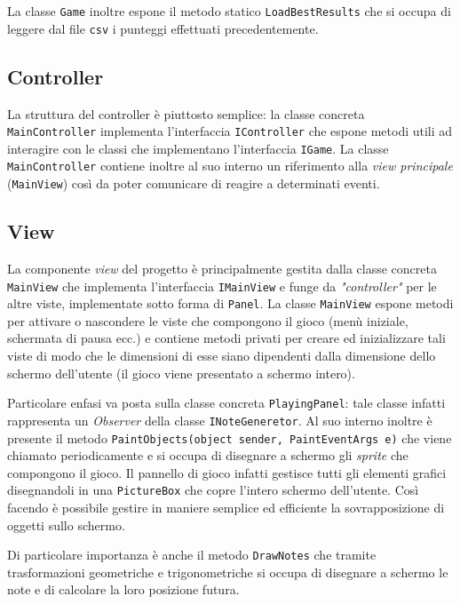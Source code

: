 La classe \texttt{Game} inoltre espone il metodo statico \texttt{LoadBestResults} che si occupa di leggere dal file \texttt{csv} i punteggi effettuati precedentemente.

\newpage
\subsection{Controller}
\begin{figure}[h]
\end{figure}
La struttura del controller è piuttosto semplice: la classe concreta \texttt{MainController} implementa l'interfaccia \texttt{IController} che espone metodi utili ad interagire con le classi che implementano l'interfaccia \texttt{IGame}.
La classe \texttt{MainController} contiene inoltre al suo interno un riferimento alla \emph{view principale} (\texttt{MainView}) così da poter comunicare di reagire a determinati eventi.

\newpage
\subsection{View}
\begin{figure}[h!]
\end{figure}
La componente \emph{view} del progetto è principalmente gestita dalla classe concreta \texttt{MainView} che implementa l'interfaccia \texttt{IMainView} e funge da \emph{"controller"} per le altre viste, implementate sotto forma di \texttt{Panel}.
La classe \texttt{MainView} espone metodi per attivare o nascondere le viste che compongono il gioco (menù iniziale, schermata di pausa ecc.) e contiene metodi privati per creare ed inizializzare tali viste di modo che le dimensioni di esse siano dipendenti dalla dimensione dello schermo dell'utente (il gioco viene presentato a schermo intero).

\vspace{0.5cm}
Particolare enfasi va posta sulla classe concreta \texttt{PlayingPanel}: tale classe infatti rappresenta un \emph{Observer} della classe \texttt{INoteGeneretor}.
Al suo interno inoltre è presente il metodo \texttt{PaintObjects(object sender, PaintEventArgs e)} che viene chiamato periodicamente e si occupa di disegnare a schermo gli \emph{sprite} che compongono il gioco.
Il pannello di gioco infatti gestisce tutti gli elementi grafici disegnandoli in una \texttt{PictureBox} che copre l'intero schermo dell'utente. Così facendo è possibile gestire in maniere semplice ed efficiente la sovrapposizione di oggetti sullo schermo.

Di particolare importanza è anche il metodo \texttt{DrawNotes} che tramite trasformazioni geometriche e trigonometriche si occupa di disegnare a schermo le note e di calcolare la loro posizione futura.